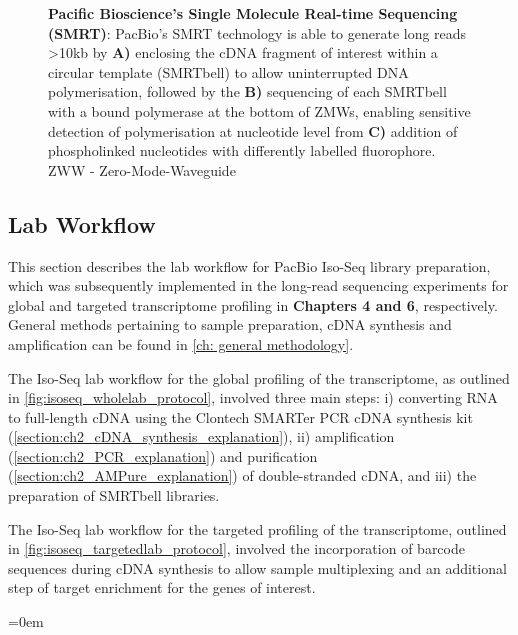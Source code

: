 \begin{figure}[!h]
	\captionsetup{width=0.95\textwidth}
	\caption[Pacific Bioscience's Single Molecule Real-time Sequencing]%
	{\textbf{Pacific Bioscience's Single Molecule Real-time Sequencing (SMRT)}: PacBio's SMRT technology is able to generate long reads >10kb by \textbf{A)} enclosing the cDNA fragment of interest within a circular template (SMRTbell) to allow uninterrupted DNA polymerisation,  followed by the \textbf{B)} sequencing of each SMRTbell with a bound polymerase at the bottom of ZMWs, enabling sensitive detection of polymerisation at nucleotide level from \textbf{C)} addition of phospholinked nucleotides with differently labelled fluorophore. ZWW - Zero-Mode-Waveguide}
	\label{fig:Mechanism}
\end{figure}


\subsection{Lab Workflow}
\label{chap:isoseq_labpipeline}
This section describes the lab workflow for PacBio Iso-Seq library preparation, which was subsequently implemented in the long-read sequencing experiments for global and targeted transcriptome profiling in \textbf{Chapters 4 and 6}, respectively. General methods pertaining to sample preparation, cDNA synthesis and amplification can be found in \cref{ch: general methodology}.

The Iso-Seq lab workflow for the global profiling of the transcriptome, as outlined in \cref{fig:isoseq_wholelab_protocol}, involved three main steps: i) converting RNA to full-length cDNA using the Clontech SMARTer PCR cDNA synthesis kit (\cref{section:ch2_cDNA_synthesis_explanation}), ii) amplification (\cref{section:ch2_PCR_explanation}) and purification (\cref{section:ch2_AMPure_explanation}) of double-stranded cDNA, and iii) the preparation of SMRTbell libraries. 

The Iso-Seq lab workflow for the targeted profiling of the transcriptome, outlined in \cref{fig:isoseq_targetedlab_protocol}, involved the incorporation of barcode sequences during cDNA synthesis to allow sample multiplexing and an additional step of target enrichment for the genes of interest.

\vspace{3cm}
\begingroup
\parindent=0em
\localtableofcontents 
\endgroup

